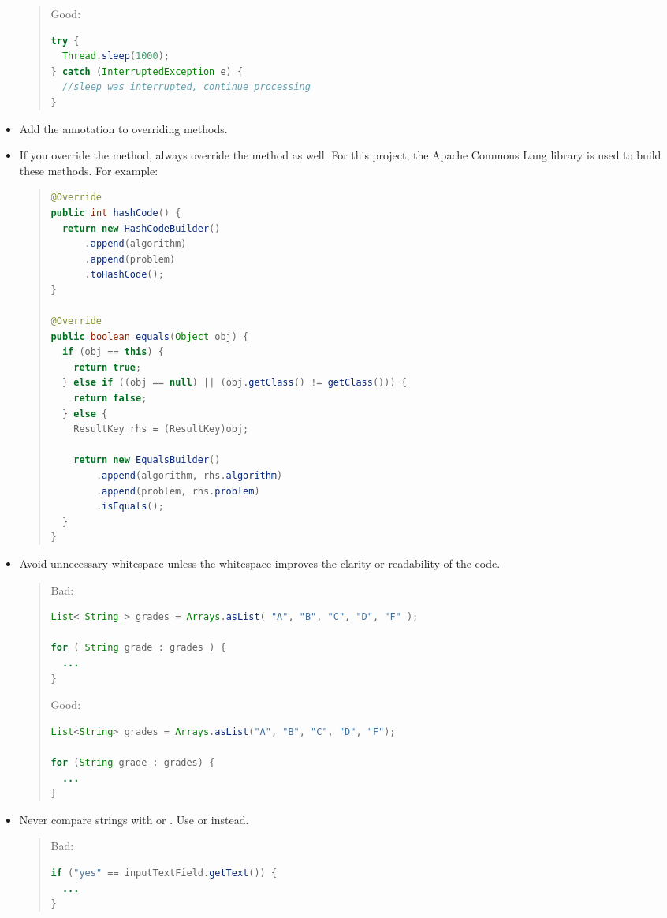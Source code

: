 \begin{itemize}
\begin{quote}
      Good:
      \begin{lstlisting}[language=Java]
try {
  Thread.sleep(1000);
} catch (InterruptedException e) {
  //sleep was interrupted, continue processing
}
      \end{lstlisting}
    \end{quote}
  
  \item Add the  annotation to overriding methods.
  
  \item If you override the  method, always override the  method as well.  For this project, the Apache Commons Lang library is used to build these methods.  For example:
    \begin{quote}
      \begin{lstlisting}[language=Java]
@Override
public int hashCode() {
  return new HashCodeBuilder()
      .append(algorithm)
      .append(problem)
      .toHashCode();
}

@Override
public boolean equals(Object obj) {
  if (obj == this) {
    return true;
  } else if ((obj == null) || (obj.getClass() != getClass())) {
    return false;
  } else {
    ResultKey rhs = (ResultKey)obj;
			
    return new EqualsBuilder()
        .append(algorithm, rhs.algorithm)
        .append(problem, rhs.problem)
        .isEquals();
  }
}
      \end{lstlisting}
    \end{quote}

  \item Avoid unnecessary whitespace unless the whitespace improves the clarity or readability of the code.
    \begin{quote}
      Bad:
      \begin{lstlisting}[language=Java]
List< String > grades = Arrays.asList( "A", "B", "C", "D", "F" );

for ( String grade : grades ) {
  ...
}
      \end{lstlisting}
      
      Good:
      \begin{lstlisting}[language=Java]
List<String> grades = Arrays.asList("A", "B", "C", "D", "F");

for (String grade : grades) {
  ...
}
      \end{lstlisting}
    \end{quote}
  
  \item Never compare strings with \java{==} or \java{!=}.  Use  or  instead.
    \begin{quote}
      Bad:
      \begin{lstlisting}[language=Java]
if ("yes" == inputTextField.getText()) {
  ...
}
      \end{lstlisting}
      

\end{quote}
\end{itemize}
